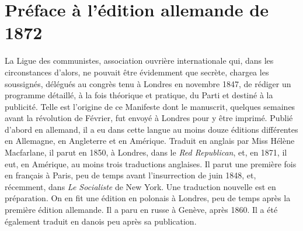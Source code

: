 \documentclass[french,twoside]{book} %
\begin{document}
\section[Préface à l’édition allemande de 1872]{Préface à l’édition allemande de 1872}
\noindent La Ligue des communistes, association ouvrière internationale qui, dans les circonstances d’alors, ne pouvait être évidemment que secrète, chargea les soussignés, délégués au congrès tenu à Londres en novembre 1847, de rédiger un programme détaillé, à la fois théorique et pratique, du Parti et destiné à la publicité. Telle est l’origine de ce Manifeste dont le manuscrit, quelques semaines avant la révolution de Février, fut envoyé à Londres pour y être imprimé. Publié d’abord en allemand, il a eu dans cette langue au moins douze éditions différentes en Allemagne, en Angleterre et en Amérique. Traduit en anglais par Miss Hélène Macfarlane, il parut en 1850, à Londres, dans le \emph{Red Republican}, et, en 1871, il eut, en Amérique, au moins trois traductions anglaises. Il parut une première fois en français à Paris, peu de temps avant l’insurrection de juin 1848, et, récemment, dans \emph{Le Socialiste} de New York. Une traduction nouvelle est en préparation. On en fit une édition en polonais à Londres, peu de temps après la première édition allemande. Il a paru en russe à Genève, après 1860. Il a été également traduit en danois peu après sa publication.\par
\end{document}
